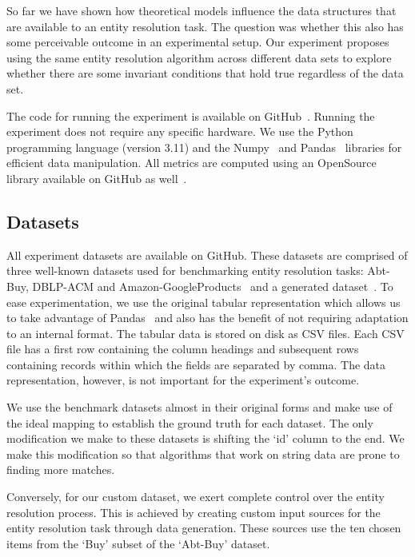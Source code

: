 So far we have shown how theoretical models influence the data structures
that are available to an entity resolution task.
The question was whether this also has some perceivable outcome in an
experimental setup.
Our experiment proposes using the same entity resolution algorithm across
different data sets to explore whether there are some invariant conditions
that hold true regardless of the data set.

The code for running the experiment is available on GitHub~\cite{matchescu}.
Running the experiment does not require any specific hardware.
We use the Python~\cite{python} programming language (version 3.11) and the
Numpy~\cite{numpy} and Pandas~\cite{pandas2023} libraries for efficient
data manipulation.
All metrics are computed using an OpenSource library available on GitHub as
well~\cite{er-metrics}.

\subsection{Datasets}\label{subsec:data}

All experiment datasets are available on GitHub\cite{expdata2023}.
These datasets are comprised of three well-known datasets used for
benchmarking entity resolution tasks: Abt-Buy, DBLP-ACM and
Amazon-GoogleProducts~\cite{vldb2010} and a generated dataset~\cite{expdata2023}.
To ease experimentation, we use the original tabular representation
which allows us to take advantage of Pandas~\cite{pandas2010,pandas2023}
and also has the benefit of not requiring adaptation to an internal format.
The tabular data is stored on disk as CSV files.
Each CSV file has a first row containing the column headings and subsequent
rows containing records within which the fields are separated by comma.
The data representation, however, is not important for the experiment's
outcome.

We use the benchmark datasets almost in their original forms and make use
of the ideal mapping to establish the ground truth for each dataset.
The only modification we make to these datasets is shifting the `id' column
to the end.
We make this modification so that algorithms that work on string data are prone
to finding more matches.

Conversely, for our custom dataset, we exert complete control over the
entity resolution process.
This is achieved by creating custom input sources for the entity resolution
task through data generation.
These sources use the ten chosen items from the `Buy' subset of the
`Abt-Buy' dataset.

